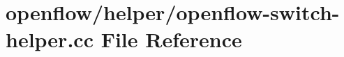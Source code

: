 \hypertarget{openflow-switch-helper_8cc}{}\section{openflow/helper/openflow-\/switch-\/helper.cc File Reference}
\label{openflow-switch-helper_8cc}
